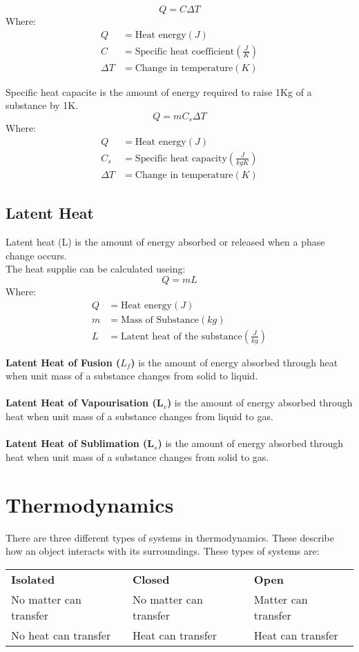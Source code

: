 \documentclass[a4paper, 12pt]{article}
\begin{document}
		\[Q=C\Delta T\]
		Where:
		\begin{align*}
			Q &= \text{Heat energy} (J) \\
			C &= \text{Specific heat coefficient} (\frac{J}{K}) \\
			\Delta T &= \text{Change in temperature} (K)
		\end{align*}

		Specific heat capacite is the amount of energy required to raise 1Kg of a substance by 1\degree K. \\
		\[Q= mC_s\Delta T \]
		Where:
		\begin{align*}
			Q &= \text{Heat energy} (J) \\
			C_s &= \text{Specific heat capacity} (\frac{J}{kg K}) \\
			\Delta T &= \text{Change in temperature} (K)
		\end{align*}
					
	\subsection{Latent Heat}
		Latent heat (L) is the amount of energy absorbed or released when a phase change occurs. \\
		The heat supplie can be calculated useing:
		\[Q = mL\]
		Where:
		\begin{align*}
			Q &= \text{Heat energy} (J) \\
			m &= \text{Mass of Substance} (kg) \\
			L &= \text{Latent heat of the substance} (\frac{J}{kg})
		\end{align*}
		
		\textbf{Latent Heat of Fusion ($L_f$)} is the amount of energy absorbed through heat when unit mass of a substance changes from solid to liquid. \\ \\
		\textbf{Latent Heat of Vapourisation (L$_v$)} is the amount of energy absorbed through heat when unit mass of a substance changes from liquid to gas. \\ \\
		\textbf{Latent Heat of Sublimation (L$_s$)} is the amount of energy absorbed through heat when unit mass of a substance changes from solid to gas.
					
\newpage

\section{Thermodynamics}
	There are three different types of systems in thermodynamics. These describe how an object interacts with its surroundings. These types of systems are: \\
	\par
	\begin{tabularx}{\linewidth}{l l l}
		\textbf{Isolated} & \textbf{Closed} & \textbf{Open} \\
		No matter can transfer & No matter can transfer & Matter can transfer \\
		No heat can transfer & Heat can transfer & Heat can transfer \\
	\end{tabularx}
	\par
	
\end{document}
